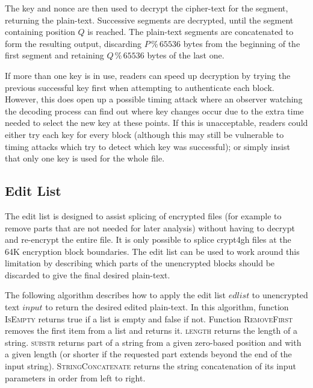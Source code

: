 \documentclass[10pt]{article}
\begin{document}
The key and nonce are then used to decrypt the cipher-text for the segment, returning the plain-text.
Successive segments are decrypted, until the segment containing position $Q$ is reached.
The plain-text segments are concatenated to form the resulting output, discarding $P \mathbin{\%} 65536$ bytes from
the beginning of the first segment and retaining $Q \mathbin{\%} 65536$ bytes of the last one.

If more than one key is in use, readers can speed up decryption by trying the previous successful key first when
attempting to authenticate each block.
However, this does open up a possible timing attack where an observer watching the decoding process can find
out where key changes occur due to the extra time needed to select the new key at these points.
If this is unacceptable, readers could either try each key for every block (although this may still be vulnerable
to timing attacks which try to detect which key was successful); or simply insist that only one key is used for
the whole file.

\subsection{Edit List}

The edit list is designed to assist splicing of encrypted files (for example to remove parts that are not needed
for later analysis) without having to decrypt and re-encrypt the entire file.
It is only possible to splice crypt4gh files at the 64K encryption block boundaries.
The edit list can be used to work around this limitation by describing which parts of the unencrypted blocks
should be discarded to give the final desired plain-text.

The following algorithm describes how to apply the edit list $edlist$ to unencrypted text $input$ to return
the desired edited plain-text.
In this algorithm, function \textsc{IsEmpty} returns true if a list is empty and false if not.
Function \textsc{RemoveFirst} removes the first item from a list and returns it.
\textsc{length} returns the length of a string.
\textsc{substr} returns part of a string from a given zero-based position and with a given length (or shorter if the
requested part extends beyond the end of the input string).
\textsc{StringConcatenate} returns the string concatenation of its input parameters in order from left to right.
\end{document}
